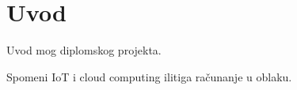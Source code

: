 \chapter{Uvod}

Uvod mog diplomskog projekta.

Spomeni IoT i cloud computing ilitiga računanje u oblaku.

\eject